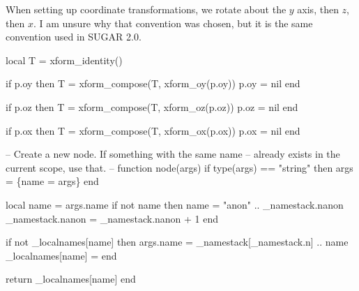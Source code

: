 When setting up coordinate transformations,
we rotate about the $y$ axis, then $z$, then $x$.  I am unsure why
that convention was chosen, but it is the same convention used in
SUGAR 2.0.

\nwenddocs{}\endmoddef
local T = xform_identity()

if p.oy then
  T = xform_compose(T, xform_oy(p.oy))
  p.oy = nil
end

if p.oz then
  T = xform_compose(T, xform_oz(p.oz))
  p.oz = nil
end

if p.ox then
  T = xform_compose(T, xform_ox(p.ox))
  p.ox = nil
end

\nwendcode{}\nwdocspar

\nwenddocs{}\plusendmoddef
-- Create a new node.  If something with the same name
-- already exists in the current scope, use that.
--
function node(args)
  if type(args) == "string" then
    args = \{name = args\}
  end

  local name = args.name
  if not name then
    name = "anon" .. _namestack.nanon
    _namestack.nanon = _namestack.nanon + 1
  end

  if not _localnames[name] then 
    args.name = _namestack[_namestack.n] .. name
    _localnames[name] = %
  end

  return _localnames[name]
end

\nwendcode{}

%
%
%
%
%
\nwdocspar

\nwenddocs{}
